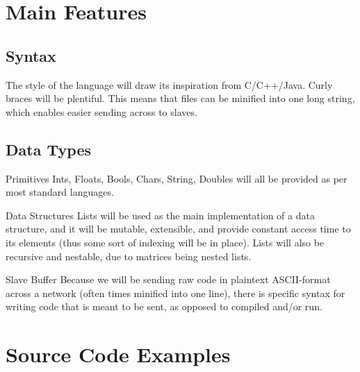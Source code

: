 \documentclass[10pt]{article}
\begin{document}
\section{Main Features}
	\subsection{Syntax}
    The style of the language will draw its inspiration from C/C++/Java. Curly braces will be plentiful. This means that \name files can be minified into one long string, which enables easier sending across to slaves.
    \subsection{Data Types}
    \begin{description}
    \item{Primitives} Ints, Floats, Bools, Chars, String, Doubles will all be provided as per most standard languages.
    \item{Data Structures} Lists will be used as the main implementation of a data structure, and it will be mutable, extensible, and provide constant access time to its elements (thus some sort of indexing will be in place). Lists will also be recursive and nestable, due to matrices being nested lists.
    \item{Slave Buffer} Because we will be sending raw code in plaintext ASCII-format across a network (often times minified into one line), there is specific syntax for writing code that is meant to be sent, as opposed to compiled and/or run.
    \end{description}
    
\section{Source Code Examples}
	
\end{document}
